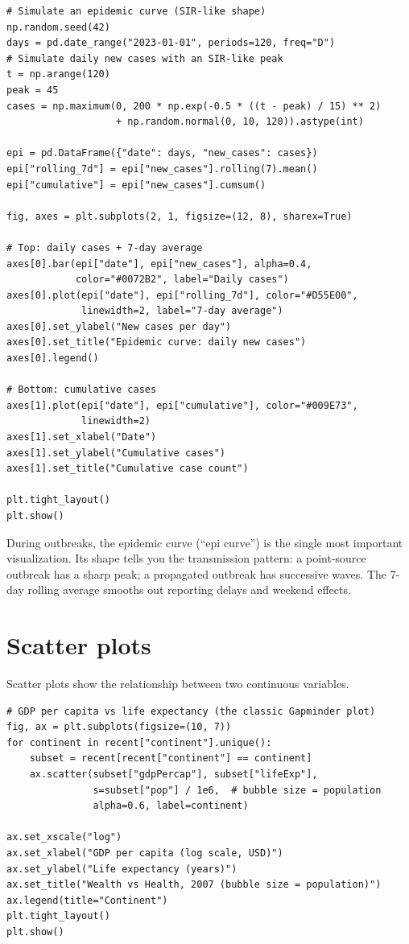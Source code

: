 \begin{verbatim}
# Simulate an epidemic curve (SIR-like shape)
np.random.seed(42)
days = pd.date_range("2023-01-01", periods=120, freq="D")
# Simulate daily new cases with an SIR-like peak
t = np.arange(120)
peak = 45
cases = np.maximum(0, 200 * np.exp(-0.5 * ((t - peak) / 15) ** 2)
                   + np.random.normal(0, 10, 120)).astype(int)

epi = pd.DataFrame({"date": days, "new_cases": cases})
epi["rolling_7d"] = epi["new_cases"].rolling(7).mean()
epi["cumulative"] = epi["new_cases"].cumsum()

fig, axes = plt.subplots(2, 1, figsize=(12, 8), sharex=True)

# Top: daily cases + 7-day average
axes[0].bar(epi["date"], epi["new_cases"], alpha=0.4,
            color="#0072B2", label="Daily cases")
axes[0].plot(epi["date"], epi["rolling_7d"], color="#D55E00",
             linewidth=2, label="7-day average")
axes[0].set_ylabel("New cases per day")
axes[0].set_title("Epidemic curve: daily new cases")
axes[0].legend()

# Bottom: cumulative cases
axes[1].plot(epi["date"], epi["cumulative"], color="#009E73",
             linewidth=2)
axes[1].set_xlabel("Date")
axes[1].set_ylabel("Cumulative cases")
axes[1].set_title("Cumulative case count")

plt.tight_layout()
plt.show()
\end{verbatim}

\begin{clinicalnote}
During outbreaks, the epidemic curve (``epi curve'') is the single most important visualization. Its shape tells you the transmission pattern: a point-source outbreak has a sharp peak; a propagated outbreak has successive waves. The 7-day rolling average smooths out reporting delays and weekend effects.
\end{clinicalnote}

\section{Scatter plots}

Scatter plots show the relationship between two continuous variables.

\begin{verbatim}
# GDP per capita vs life expectancy (the classic Gapminder plot)
fig, ax = plt.subplots(figsize=(10, 7))
for continent in recent["continent"].unique():
    subset = recent[recent["continent"] == continent]
    ax.scatter(subset["gdpPercap"], subset["lifeExp"],
               s=subset["pop"] / 1e6,  # bubble size = population
               alpha=0.6, label=continent)

ax.set_xscale("log")
ax.set_xlabel("GDP per capita (log scale, USD)")
ax.set_ylabel("Life expectancy (years)")
ax.set_title("Wealth vs Health, 2007 (bubble size = population)")
ax.legend(title="Continent")
plt.tight_layout()
plt.show()
\end{verbatim}


